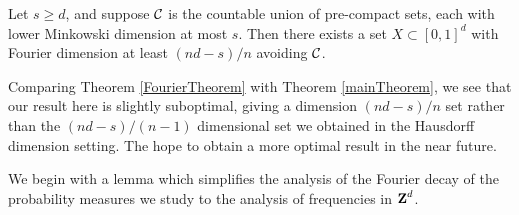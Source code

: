 \begin{theorem} \label{FourierTheorem}
    Let $s \geq d$, and suppose $\operatorname{\mathcal{C}}$ is the countable union of pre-compact sets, each with lower Minkowski dimension at most $s$. Then there exists a set $X \subset [0,1]^d$ with Fourier dimension at least $(nd - s)/n$ avoiding $\operatorname{\mathcal{C}}$.
\end{theorem}

\begin{remark}
    Comparing Theorem \ref{FourierTheorem} with Theorem \ref{mainTheorem}, we see that our result here is slightly suboptimal, giving a dimension $(nd - s)/n$ set rather than the $(nd - s)/(n-1)$ dimensional set we obtained in the Hausdorff dimension setting. The hope to obtain a more optimal result in the near future.
\end{remark}

We begin with a lemma which simplifies the analysis of the Fourier decay of the probability measures we study to the analysis of frequencies in $\operatorname{\mathbf{Z}}^d$.

